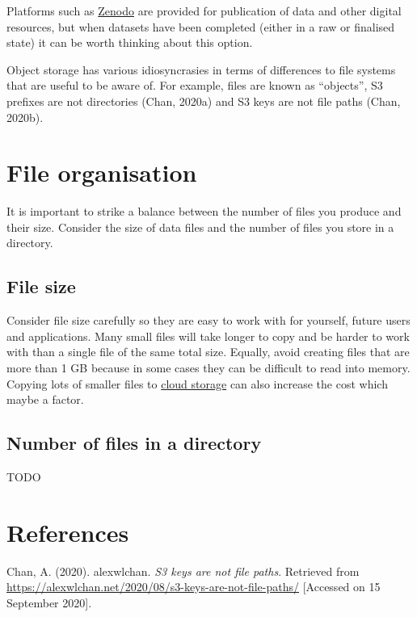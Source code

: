 \documentclass[a4paper,oneside]{report}
\begin{document}
Platforms such as \href{https://zenodo.org}{Zenodo} are provided for
publication of data and other digital resources, but when datasets have
been completed (either in a raw or finalised state) it can be worth
thinking about this option.

Object storage has various idiosyncrasies in terms of differences to
file systems that are useful to be aware of. For example, files are
known as ``objects'', S3 prefixes are not directories (Chan, 2020a) and
S3 keys are not file paths (Chan, 2020b).

\hypertarget{file-organisation}{%
\section{File organisation}\label{file-organisation}}

It is important to strike a balance between the number of files you
produce and their size. Consider the size of data files and the number
of files you store in a directory.

\hypertarget{file-size}{%
\subsection{File size}\label{file-size}}

Consider file size carefully so they are easy to work with for yourself,
future users and applications. Many small files will take longer to copy
and be harder to work with than a single file of the same total size.
Equally, avoid creating files that are more than 1 GB because in some
cases they can be difficult to read into memory. Copying lots of smaller
files to \protect\hyperlink{cloud-storage}{cloud storage} can also
increase the cost which maybe a factor.

\hypertarget{number-of-files-in-a-directory}{%
\subsection{Number of files in a
directory}\label{number-of-files-in-a-directory}}

TODO

\hypertarget{references}{%
\section{References}\label{references}}

Chan, A. (2020). alexwlchan. \emph{S3 keys are not file paths}.
Retrieved from
\url{https://alexwlchan.net/2020/08/s3-keys-are-not-file-paths/}
{[}Accessed on 15 September 2020{]}.
\end{document}
